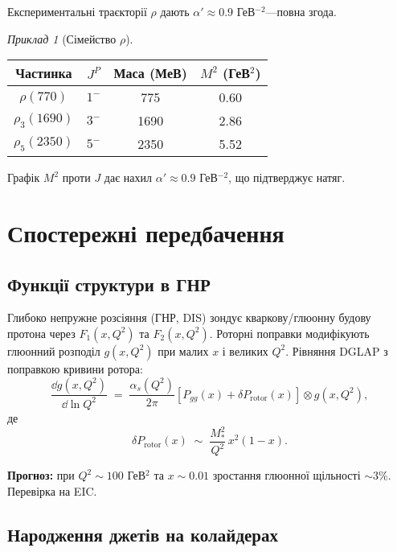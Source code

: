 \documentclass[11pt,a4paper]{article}
\theoremstyle{definition}
\theoremstyle{plain}
\theoremstyle{remark}
\newtheorem{example}{Приклад}[section]
\begin{document}
Експериментальні траєкторії $\rho$ дають $\alpha'\approx 0{.}9$ ГеВ$^{-2}$—повна згода.

\begin{example}[Сімейство $\rho$]
\begin{center}
\begin{tabular}{cccc}
\toprule
Частинка & $J^P$ & Маса (МеВ) & $M^2$ (ГеВ$^2$) \\
\midrule
$\rho(770)$    & $1^-$ & 775  & 0{.}60 \\
$\rho_3(1690)$ & $3^-$ & 1690 & 2{.}86 \\
$\rho_5(2350)$ & $5^-$ & 2350 & 5{.}52 \\
\bottomrule
\end{tabular}
\end{center}
Графік $M^2$ проти $J$ дає нахил $\alpha'\approx 0{.}9$ ГеВ$^{-2}$, що підтверджує натяг.
\end{example}

\vspace{1em}

\section{Спостережні передбачення}
\label{sec:observables}

\subsection{Функції структури в ГНР}

Глибоко непружне розсіяння (ГНР, DIS) зондує кваркову/глюонну будову протона через $F_1(x,Q^2)$ та $F_2(x,Q^2)$. Роторні поправки модифікують глюонний розподіл $g(x,Q^2)$ при малих $x$ і великих $Q^2$. Рівняння DGLAP з поправкою кривини ротора:
\begin{equation}
\frac{\dd g(x,Q^2)}{\dd \ln Q^2} \;=\; \frac{\alpha_s(Q^2)}{2\pi}\left[P_{gg}(x) + \delta P_{\mathrm{rotor}}(x)\right] \otimes g(x,Q^2),
\end{equation}
де
\begin{equation}
\delta P_{\mathrm{rotor}}(x) \;\sim\; \frac{M_\ast^2}{Q^2}\,x^2(1-x).
\end{equation}

\textbf{Прогноз:} при $Q^2\sim 100$ ГеВ$^2$ та $x\sim 0{.}01$ зростання глюонної щільності $\sim 3\%$. Перевірка на EIC.

\subsection{Народження джетів на колайдерах}
\end{document}
